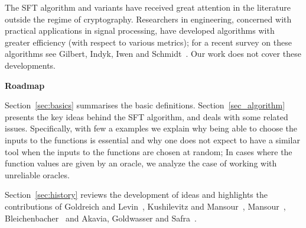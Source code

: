 \documentclass[11pt]{article}
\theoremstyle{definition}
\begin{document}
The SFT algorithm and variants have received great attention in the literature outside the regime of cryptography.
Researchers in engineering, concerned with practical applications in signal processing, have developed algorithms with greater efficiency (with respect to various metrics); for a recent survey on these algorithms see Gilbert, Indyk, Iwen and Schmidt~\cite{Fourier_survey}. Our work does not cover these developments.

\vskip 0.2cm

\noindent \textbf{Roadmap}

Section~\ref{sec:basics} summarises the basic definitions. Section~\ref{sec_algorithm} presents the key ideas behind the SFT algorithm, and deals with some related issues. Specifically, with few a examples we explain why being able to choose the inputs to the functions is essential and why one does not expect to have a similar tool when the inputs to the functions are chosen at random; In cases where the function values are given by an oracle, we analyze the case of working with unreliable oracles.

Section~\ref{sec:history} reviews the development of ideas and highlights the contributions of
Goldreich and Levin~\cite{GL}, Kushilevitz and Mansour~\cite{KM}, Mansour~\cite{Mansour92}, Bleichenbacher~\cite{Bleichenbacher} and Akavia, Goldwasser and Safra~\cite{AGS}.
\end{document}
